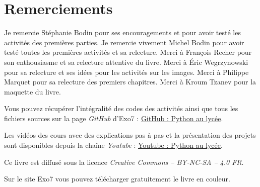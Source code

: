 
\clearemptydoublepage
\pagestyle{empty}\thispagestyle{empty}

\vspace*{\fill}

\section*{Remerciements}


Je remercie Stéphanie Bodin pour ses encouragements et pour avoir testé les activités des premières parties.
Je remercie vivement Michel Bodin pour avoir testé toutes les premières activités et sa relecture.
Merci à François Recher pour son enthousiasme et sa relecture attentive du livre. 
Merci à Éric Wegrzynowski pour sa relecture et ses idées pour les activités sur les images. 
Merci à Philippe Marquet pour sa relecture des premiers chapitres. Merci à Kroum Tzanev pour la maquette du livre.


\bigskip

\begin{center}
Vous pouvez récupérer l'intégralité des codes \Python{} des activités ainsi que tous les fichiers sources sur la page \emph{GitHub} d'Exo7 :
\href{https://github.com/exo7math}{\og{}GitHub : Python au lycée\fg{}}.

\medskip

Les vidéos des cours avec des explications pas à pas et la présentation des projets sont disponibles depuis la chaîne \emph{Youtube} :
\href{https://www.youtube.com/PythonAuLycée}{\og{}Youtube : Python au lycée\fg{}}.


\end{center}


\vspace*{\fill}

\bigskip 

\begin{center}
\end{center}



\begin{center}
Ce livre est diffusé sous la licence \emph{Creative Commons -- BY-NC-SA -- 4.0 FR}.

Sur le site Exo7 vous pouvez télécharger gratuitement le livre en couleur.
\end{center}




\printindex
{}

